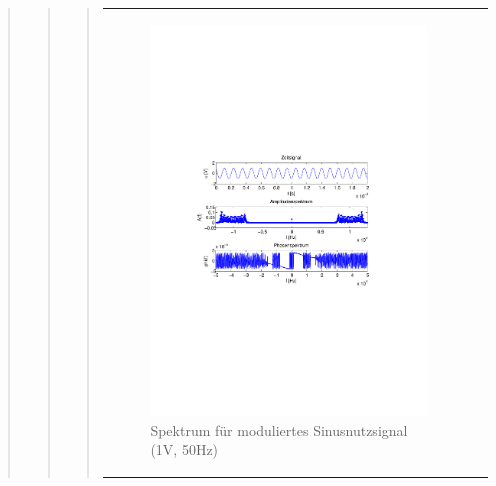 \begin{quote}
\begin{quote}
\begin{quote}
\begin{center}
\begin{tabular}{ll}
\begin{minipage}{0.6\textwidth}
                \end{minipage}
                \begin{minipage}{0.6\textwidth}

                     \begin{figure}[H]
                        \label{fig:}
                        \includegraphics[scale=0.5, trim = 2cm 6.5cm 1.5cm
                        8.5cm, clip]{./Bilder/sin_a1_f50}
                        \caption{Spektrum für moduliertes Sinusnutzsignal (1V,
                        50Hz)}
                    \end{figure}
               \vspace{-1.5em}

                \end{minipage}


\end{tabular}
\end{center}
\end{quote}
\end{quote}
\end{quote}
